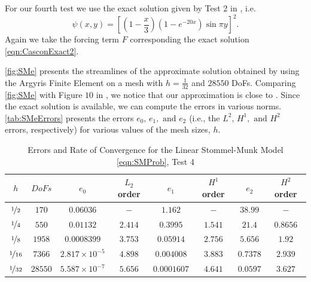 For our fourth test we use the exact solution given by Test 2 in \cite{Cascon}, i.e.
{\small
\begin{equation}
  \psi(x,y) = \left[\left(1 - \frac{x}{3}\right)\left(1-e^{-20x}\right) \sin \pi y\right]^2.
  \label{eqn:CasconExact2}
\end{equation}
}
Again we take the forcing term $F$ corresponding the exact solution \eqref{eqn:CasconExact2}. 

\autoref{fig:SMe} presents the streamlines of the approximate solution obtained by using the Argyris
Finite Element on a mesh with $h=\frac{1}{32}$ and $28550$ DoFs. Comparing \autoref{fig:SMe} with
Figure $10$ in \cite{Myers}, we notice that our approximation is close to \cite{Myers}. Since the
exact solution is available, we can compute the errors in various norms. \autoref{tab:SMeErrors}
presents the errors $e_0,\, e_1, \text{ and } e_2$ (i.e., the $L^2,\, H^1, \text{ and } H^2$ errors,
respectively) for various values of the mesh sizes, $h$.

\begin{table}[H]
\begin{center}
\begin{tabular}{|c|c|c|c|c|c|c|c|}%
  \hline
  $h$ & $DoFs$ & $e_0$ & $L_2$ order & $e_1$ & $H^1$ order & $e_2$ & $H^2$ order \\[0.2em] %
  \hline
  $\nicefrac{1}{2}$ & $170$ & $0.06036$ & $-$ & $1.162$ & $-$ & $38.99$ & $-$ \\[0.2em] %
  $\nicefrac{1}{4}$ & $550$ & $0.01132$ & $2.414$ & $0.3995$ & $1.541$ & $21.4$ & $0.8656$ \\[0.2em] %
  $\nicefrac{1}{8}$ & $1958$ & $0.0008399$ & $3.753$ & $0.05914$ & $2.756$ & $5.656$ & $1.92$ \\[0.2em] %
  $\nicefrac{1}{16}$ & $7366$ & $2.817\times 10^{-5}$ & $4.898$ & $0.004008$ & $3.883$ & $0.7378$ & $2.939$ \\[0.2em] %
  $\nicefrac{1}{32}$ & $28550$ & $5.587\times 10^{-7}$ & $5.656$ & $0.0001607$ & $4.641$ & $0.0597$ & $3.627$ \\[0.2em] %
 \hline
\end{tabular}
\end{center}
\caption{Errors and Rate of Convergence for the Linear Stommel-Munk Model \eqref{eqn:SMProb}, Test 4 \cite{Cascon}}
\label{tab:SMeErrors}
\end{table}

